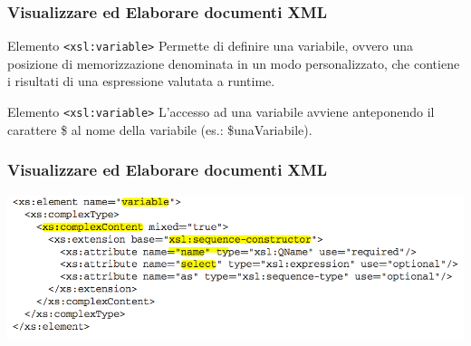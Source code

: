 
\begin{frame}
    \frametitle{Visualizzare ed Elaborare documenti XML}
    \addtocounter{nframe}{1}
    

     \begin{block}{Elemento \texttt{<xsl:variable>}}
        Permette di definire una variabile, ovvero una posizione di memorizzazione denominata in un modo personalizzato, che contiene i risultati di una espressione valutata a runtime.
     \end{block}

     \begin{block}{Elemento \texttt{<xsl:variable>}}
        L’accesso ad una variabile avviene anteponendo il carattere \$ al nome della variabile (es.: \$unaVariabile).
     \end{block}

\end{frame}

\begin{frame}
    \frametitle{Visualizzare ed Elaborare documenti XML}
    \addtocounter{nframe}{1}
    
    \begin{center}
        \includegraphics[width=.95\textwidth]{imgs/Schema-variable.png}
    \end{center}

\end{frame}

